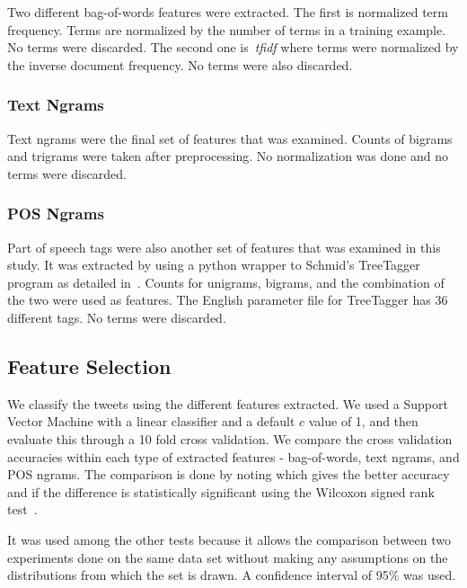 \documentclass[a4paper]{llncs}
\begin{document}
Two different bag-of-words features were extracted. The first is normalized term frequency. Terms are normalized by the number of terms in a training example. No terms were discarded. The second one is~\textit{tfidf} where terms were normalized by the inverse document frequency. No terms were also discarded. 

\subsubsection{Text Ngrams}
Text ngrams were the final set of features that was examined. Counts of bigrams and trigrams were taken after preprocessing. No normalization was done and no terms were discarded. 

\subsubsection{POS Ngrams}
Part of speech tags were also another set of features that was examined in this study. It was extracted by using a python wrapper to Schmid's TreeTagger program as detailed in~\cite{schmid1994probabilistic}. Counts for unigrams, bigrams, and the combination of the two were used as features. The English parameter file for TreeTagger has 36 different tags. No terms were discarded.





\subsection{Feature Selection}

We classify the tweets using the different features extracted. We used a Support Vector Machine with a linear classifier and a default $c$ value of 1, and then evaluate this through a 10 fold cross validation. We compare the cross validation accuracies within each type of extracted features - bag-of-words, text ngrams, and POS ngrams. The comparison is done by noting which gives the better accuracy and if the difference is statistically significant using the Wilcoxon signed rank test~\cite{wilcoxon1945individual}.


It was used among the other tests because it allows the comparison between two experiments done on the same data set without making any assumptions on the distributions from which the set is drawn. A confidence interval of 95\% was used. 

\end{document}
